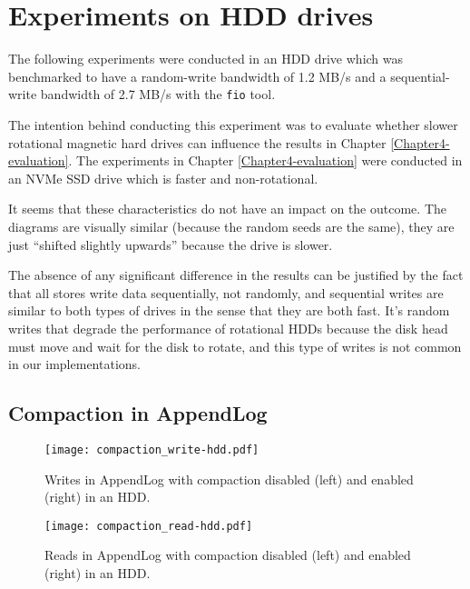 

\chapter{Experiments on HDD drives} %
\label{Appendix-B} %

The following experiments were conducted in an HDD drive which was benchmarked to have a random-write bandwidth of 1.2 MB/s and a sequential-write bandwidth of 2.7 MB/s with the \verb|fio| tool.

The intention behind conducting this experiment was to evaluate whether slower rotational magnetic hard drives can influence the results in Chapter \ref{Chapter4-evaluation}. The experiments in Chapter \ref{Chapter4-evaluation} were conducted in an NVMe SSD drive which is faster and non-rotational.

It seems that these characteristics do not have an impact on the outcome. The diagrams are visually similar (because the random seeds are the same), they are just ``shifted slightly upwards'' because the drive is slower.

The absence of any significant difference in the results can be justified by the fact that all stores write data sequentially, not randomly, and sequential writes are similar to both types of drives in the sense that they are both fast. It's random writes that degrade the performance of rotational HDDs because the disk head must move and wait for the disk to rotate, and this type of writes is not common in our implementations.

\section{Compaction in AppendLog}

\begin{figure}[h]
    \centering
    \texttt{[image: compaction\_write-hdd.pdf]}
    \caption{Writes in AppendLog with compaction disabled (left) and enabled (right) in an HDD.}
    \label{fig:compaction-write-hdd}
\end{figure}

\begin{figure}[h]
    \centering
    \texttt{[image: compaction\_read-hdd.pdf]}
    \caption{Reads in AppendLog with compaction disabled (left) and enabled (right) in an HDD.}
    \label{fig:compaction-read-hdd}
\end{figure}

